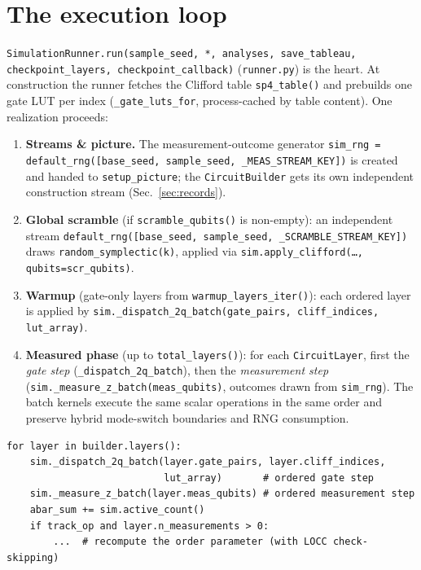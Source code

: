 \documentclass[11pt]{article}
\newcommand{\code}[1]{\texttt{#1}}
\newcommand{\file}[1]{\texttt{#1}}
\begin{document}
\section{The execution loop}
\label{sec:runner}
\code{SimulationRunner.run(sample\_seed, *, analyses, save\_tableau, checkpoint\_layers,
checkpoint\_callback)} (\file{runner.py}) is the heart. At
construction the runner fetches the Clifford table \code{sp4\_table()} and prebuilds one gate LUT per index
(\code{\_gate\_luts\_for}, process-cached by table content). One realization proceeds:
\begin{enumerate}[itemsep=2pt]
\item \textbf{Streams \& picture.} The measurement-outcome generator
\code{sim\_rng = default\_rng([base\_seed, sample\_seed, \_MEAS\_STREAM\_KEY])} is created and handed to
\code{setup\_picture}; the \code{CircuitBuilder} gets its own independent construction stream
(Sec.~\ref{sec:records}).
\item \textbf{Global scramble} (if \code{scramble\_qubits()} is non-empty): an independent stream
\code{default\_rng([base\_seed, sample\_seed, \_SCRAMBLE\_STREAM\_KEY])} draws
\code{random\_symplectic(k)}, applied via \code{sim.apply\_clifford(\dots, qubits=scr\_qubits)}.
\item \textbf{Warmup} (gate-only layers from \code{warmup\_layers\_iter()}): each ordered layer is applied by
\code{sim.\_dispatch\_2q\_batch(gate\_pairs, cliff\_indices, lut\_array)}.
\item \textbf{Measured phase} (up to \code{total\_layers()}): for each \code{CircuitLayer}, first the
\emph{gate step} (\code{\_dispatch\_2q\_batch}), then the \emph{measurement step}
(\code{sim.\_measure\_z\_batch(meas\_qubits)}, outcomes drawn from \code{sim\_rng}). The batch kernels execute
the same scalar operations in the same order and preserve hybrid mode-switch boundaries and RNG consumption.
\end{enumerate}

\begin{lstlisting}[caption={The measured-phase inner loop (\file{runner.py}).},captionpos=b]
for layer in builder.layers():
    sim._dispatch_2q_batch(layer.gate_pairs, layer.cliff_indices,
                           lut_array)       # ordered gate step
    sim._measure_z_batch(layer.meas_qubits) # ordered measurement step
    abar_sum += sim.active_count()
    if track_op and layer.n_measurements > 0:
        ...  # recompute the order parameter (with LOCC check-skipping)
\end{lstlisting}
\end{document}
